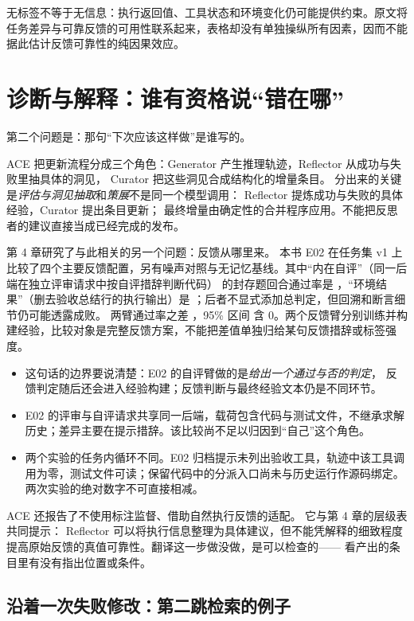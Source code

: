 无标签不等于无信息：执行返回值、工具状态和环境变化仍可能提供约束。原文将任务差异与可靠反馈的可用性联系起来，表格却没有单独操纵所有因素，因而不能据此估计反馈可靠性的纯因果效应。

\section{诊断与解释：谁有资格说``错在哪''}
\label{sec:ch07-diagnose}

第二个问题是：那句``下次应该这样做''是谁写的。

ACE 把更新流程分成三个角色：Generator 产生推理轨迹，Reflector 从成功与失败里抽具体的洞见，
Curator 把这些洞见合成结构化的增量条目\cite{ace-2510}。
分出来的关键是\emph{评估与洞见抽取}和\emph{策展}不是同一个模型调用：
Reflector 提炼成功与失败的具体经验，Curator 提出条目更新；
最终增量由确定性的合并程序应用。不能把反思者的建议直接当成已经完成的发布\cite{ace-2510}。

第 4 章研究了与此相关的另一个问题：反馈从哪里来。
本书 E02 在任务集 v1 上比较了四个主要反馈配置，另有噪声对照与无记忆基线。其中``内在自评''（同一后端在独立评审请求中按自评措辞判断代码）
的封存题回合通过率是 ，``环境结果''（删去验收总结行的执行输出）是 ；后者不显式添加总判定，但回溯和断言细节仍可能透露成败。
两臂通过率之差 ，95\% 区间 \measured{[-0.2625,+0.0875]} 含 0。两个反馈臂分别训练并构建经验，比较对象是完整反馈方案，不能把差值单独归给某句反馈措辞或标签强度。
\begin{itemize}
\sloppy
  \item 这句话的边界要说清楚：E02 的自评臂做的是\emph{给出一个通过与否的判定}，
        反馈判定随后还会进入经验构建；反馈判断与最终经验文本仍是不同环节。
  \item E02 的评审与自评请求共享同一后端，载荷包含代码与测试文件，不继承求解历史；差异主要在提示措辞。该比较尚不足以归因到“自己”这个角色。
  \item 两个实验的任务内循环不同。E02 归档提示未列出验收工具，轨迹中该工具调用为零，测试文件可读；保留代码中的分派入口尚未与历史运行作源码绑定。两次实验的绝对数字不可直接相减。
\end{itemize}

ACE 还报告了不使用标注监督、借助自然执行反馈的适配\cite{ace-2510}。
它与第 4 章的层级表共同提示：
Reflector 可以将执行信息整理为具体建议，但不能凭解释的细致程度提高原始反馈的真值可靠性。翻译这一步做没做，是可以检查的——
看产出的条目里有没有指出位置或条件。

\subsection{沿着一次失败修改：第二跳检索的例子}
\label{sec:ch07-twohop}

